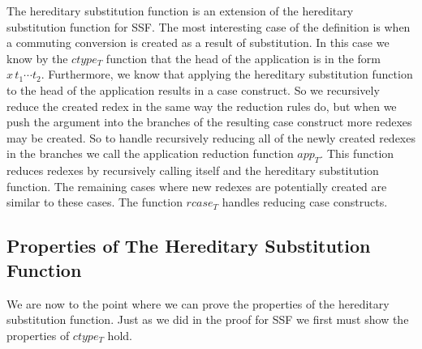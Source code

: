 The hereditary substitution function is an extension of the hereditary
substitution function for SSF.  The most interesting case of the
definition is when a commuting conversion is created as a result of
substitution.  In this case we know by the $ctype_T$ function that
the head of the application is in the form $x\,t_1 \cdots t_2$.
Furthermore, we know that applying the hereditary substitution
function to the head of the application results in a case construct.
So we recursively reduce the created redex in the same way the
reduction rules do, but when we push the argument into the branches of
the resulting case construct more redexes may be created.  So to
handle recursively reducing all of the newly created redexes in the
branches we call the application reduction function $app_T$.  This
function reduces redexes by recursively calling itself and the
hereditary substitution function.  The remaining cases where new
redexes are potentially created are similar to these cases.  The
function $rcase_T$ handles reducing case constructs.

\subsection{Properties of The Hereditary Substitution Function}
\label{sec:properties_of_the_hereditary_substitution_function_ssfp}
We are now to the point where we can prove the properties of the
hereditary substitution function.  Just as we did in the proof for SSF
we first must show the properties of $ctype_T$ hold.

